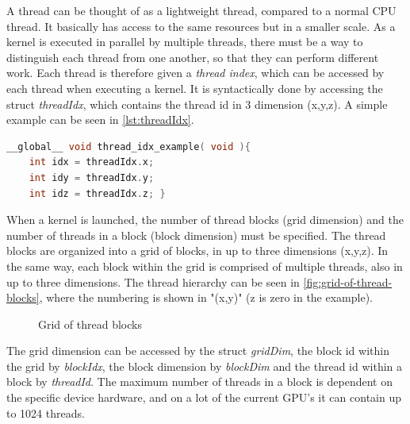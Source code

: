 A \cuda{} thread can be thought of as a lightweight thread, compared to a normal CPU thread.
It basically has access to the same resources but in a smaller scale.
As a kernel is executed in parallel by multiple threads, there must be a way to distinguish each thread from one another, so that they can perform different work.
Each thread is therefore given a \textit{thread index}, which can be accessed by each thread when executing a kernel.
It is syntactically done by accessing the struct \textit{threadIdx}, which contains the thread id in 3 dimension (x,y,z).
A simple example can be seen in \autoref{lst:threadIdx}.
\begin{lstlisting}[language=C,caption={Thread index example},label=lst:threadIdx]
__global__ void thread_idx_example( void ){
	int idx = threadIdx.x;
	int idy = threadIdx.y;
	int idz = threadIdx.z; }
\end{lstlisting}
When a kernel is launched, the number of thread blocks (grid dimension) and the number of threads in a block (block dimension) must be specified.
The thread blocks are organized into a grid of blocks, in up to three dimensions (x,y,z).
In the same way, each block within the grid is comprised of multiple threads, also in up to three dimensions.
The thread hierarchy can be seen in \autoref{fig:grid-of-thread-blocks}, where the numbering is shown in "(x,y)" (z is zero in the example).
\begin{figure}[ht]
	\centering
	\caption{Grid of thread blocks}
	\label{fig:grid-of-thread-blocks}
\end{figure}
The grid dimension can be accessed by the struct \textit{gridDim}, the block id within the grid by \textit{blockIdx}, the block dimension by \textit{blockDim} and the thread id within a block by \textit{threadId}.
The maximum number of threads in a block is dependent on the specific device hardware, and on a lot of the current GPU's it can contain up to 1024 threads\cite{cuda:programmingguide}.
